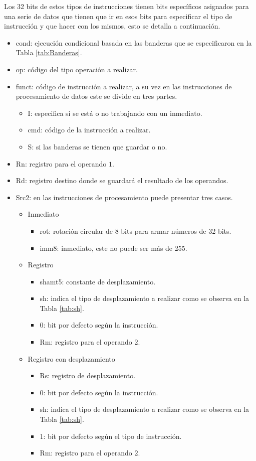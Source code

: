 \documentclass[journal,trans]{IEEEtran}
\begin{document}
	Los 32 bits de estos tipos de instrucciones tienen bits específicos asignados para una serie de datos que tienen que ir en esos bits para especificar el tipo de instrucción y que hacer con los mismos, esto se detalla a continuación.
	
	\begin{itemize}
		\item cond: ejecución condicional basada en las banderas que se especificaron en la Tabla \ref{tab:Banderas}.
		\item op: código del tipo operación a realizar.
		\item funct: código de instrucción a realizar, a su vez en las instrucciones de procesamiento de datos este se divide en tres partes.
		\begin{itemize}
			\item I: especifica si se está o no trabajando con un inmediato.
			\item cmd: código de la instrucción a realizar.
			\item S: si las banderas se tienen que guardar o no.
		\end{itemize}
		\item Rn: registro para el operando $1$.
		\item Rd: registro destino donde se guardará el resultado de los operandos.
		\item Src2: en las instrucciones de procesamiento puede presentar tres casos.
		\begin{itemize}
			\item Inmediato
			\begin{itemize}
				\item rot: rotación circular de 8 bits para armar números de 32 bits.
				\item imm8: inmediato, este no puede ser más de 255.
			\end{itemize}
			\item Registro
			\begin{itemize}
				\item shamt5: constante de desplazamiento.
				\item sh: indica el tipo de desplazamiento a realizar como se observa en la Tabla \ref{tab:sh}.
				\item 0: bit por defecto según la instrucción.
				\item Rm: registro para el operando $2$.
			\end{itemize}
			\item Registro con desplazamiento
			\begin{itemize}
				\item Rs: registro de desplazamiento.
				\item 0: bit por defecto según la instrucción.
				\item sh: indica el tipo de desplazamiento a realizar como se observa en la Tabla \ref{tab:sh}.
				\item 1: bit por defecto según el tipo de instrucción.
				\item Rm: registro para el operando $2$.
			\end{itemize}
		\end{itemize}
	\end{itemize}
\end{document}
